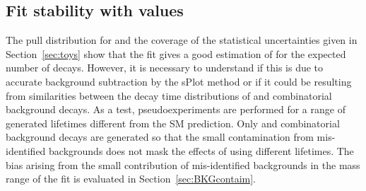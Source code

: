 
\subsection[Fit stability with \tmumu values]{Fit stability with \boldmath{\tmumu} values}

The pull distribution for \Gmumu and the coverage of the statistical uncertainties given in Section~\ref{sec:toys} show that the fit gives a good estimation of \tmumu for the expected number of decays. However, it is necessary to understand if this is due to accurate background subtraction by the sPlot method or if it could be resulting from similarities between the decay time distributions of \bsmumu and combinatorial background decays. As a test, pseudoexperiments are performed for a range of generated \bsmumu lifetimes different from the SM prediction. Only \bsmumu and combinatorial background decays are generated so that the small contamination from mis-identified backgrounds does not mask the effects of using different lifetimes. The bias arising from the small contribution of mis-identified backgrounds in the mass range of the fit is evaluated in Section~\ref{sec:BKGcontaim}. 

